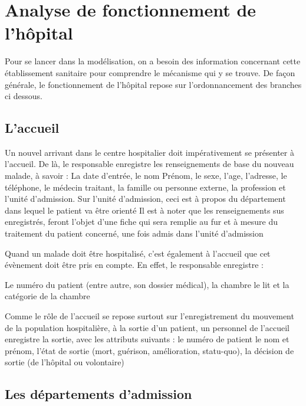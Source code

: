	
	
	
	
	
	
	
	
	
	
	
	
	
	\newpage
	\section{Analyse de fonctionnement de l'hôpital}
	Pour se lancer dans la modélisation, on a besoin des information concernant cette établissement sanitaire pour comprendre le mécanisme qui y se trouve.
	De façon générale, le fonctionnement de l'hôpital repose sur l'ordonnancement des
	branches ci dessous.
	
	\subsection{L'accueil }
	Un nouvel arrivant dans le centre hospitalier doit impérativement se présenter à l'accueil.
	De là, le responsable enregistre les renseignements de base du nouveau malade, à
	savoir :
	La date d'entrée, le nom Prénom, le sexe, l'age, l'adresse, le téléphone, le médecin traitant, la famille ou personne externe,  la profession et l'unité d'admission.
	 Sur l'unité d'admission, ceci est à propos du département dans lequel le patient va être orienté
	Il est à noter que les renseignements sus enregistrés, feront l'objet d'une fiche qui
	sera remplie au fur et à mesure du traitement du patient concerné, une fois admis
	dans l'unité d'admission
	
	\medskip
	
	Quand un malade doit être hospitalisé, c'est également à l'accueil que cet évènement
	doit être pris en compte. En effet, le responsable enregistre :
	
	Le numéro du patient (entre autre, son dossier médical), la chambre le lit et la catégorie de la chambre
	
	\medskip
	Comme le rôle de l'accueil se repose surtout sur l'enregistrement du mouvement de la	population hospitalière, à la sortie d'un patient, un personnel de l'accueil enregistre la	sortie, avec les attributs suivants :
	le numéro de patient	le nom et prénom, l'état de sortie (mort, guérison, amélioration, statu-quo), la décision de sortie (de l'hôpital ou volontaire)




\subsection{Les départements d'admission}

